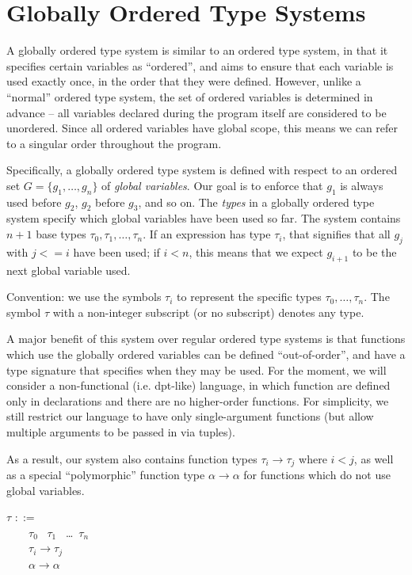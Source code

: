 \documentclass{article}
\begin{document}
\section*{Globally Ordered Type Systems}
A globally ordered type system is similar to an ordered type system, in that it specifies certain variables as ``ordered'', and aims to ensure that each variable is used exactly once, in the order that they were defined. However, unlike a ``normal'' ordered type system, the set of ordered variables is determined in advance -- all variables declared during the program itself are considered to be unordered. Since all ordered variables have global scope, this means we can refer to a singular order throughout the program.

Specifically, a globally ordered type system is defined with respect to an ordered set $G = \{g_1, \dots, g_n\}$ of \emph{global variables}. Our goal is to enforce that $g_1$ is always used before $g_2$, $g_2$ before $g_3$, and so on.
The \emph{types} in a globally ordered type system specify which global variables have been used so far. The system contains $n+1$ base types $\tau_0, \tau_1, \dots, \tau_n$. If an expression has type $\tau_i$, that signifies that all $g_j$ with $j <= i$ have been used; if $i < n$, this means that we expect $g_{i+1}$ to be the next global variable used.

Convention: we use the symbols $\tau_i$ to represent the specific types $\tau_0, \dots, \tau_n$. The symbol $\tau$ with a non-integer subscript (or no subscript) denotes any type.

A major benefit of this system over regular ordered type systems is that functions which use the globally ordered variables can be defined ``out-of-order'', and have a type signature that specifies when they may be used. For the moment, we will consider a non-functional (i.e. dpt-like) language, in which function are defined only in declarations and there are no higher-order functions. For simplicity, we still restrict our language to have only single-argument functions (but allow multiple arguments to be passed in via tuples).

As a result, our system also contains function types $\tau_i \rightarrow \tau_j$ where $i < j$, as well as a special ``polymorphic'' function type $\alpha \rightarrow \alpha$ for functions which do not use global variables.

   $\tau$ $::=$ \\
	 \indent\ \ \ \textpipe\ $\tau_0$ \textpipe\ $\tau_1$ \textpipe\ \dots \textpipe\ $\tau_n$\\
	 \indent\ \ \ \textpipe\ $\tau_i \rightarrow \tau_j$\\
	 \indent\ \ \ \textpipe\ $\alpha \rightarrow \alpha$
\end{document}
